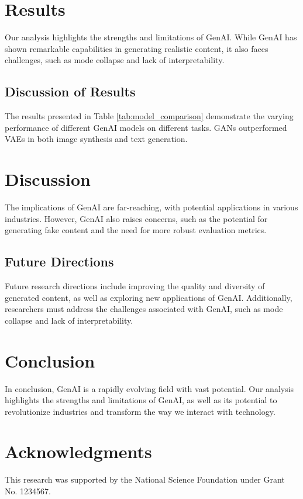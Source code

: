 \documentclass[12pt,a4paper]{article}
\begin{document}
\section{Results}
Our analysis highlights the strengths and limitations of GenAI. While GenAI has shown remarkable capabilities in generating realistic content, it also faces challenges, such as mode collapse and lack of interpretability.

\subsection{Discussion of Results}
The results presented in Table \ref{tab:model_comparison} demonstrate the varying performance of different GenAI models on different tasks. GANs outperformed VAEs in both image synthesis and text generation.

\section{Discussion}
The implications of GenAI are far-reaching, with potential applications in various industries. However, GenAI also raises concerns, such as the potential for generating fake content and the need for more robust evaluation metrics.

\subsection{Future Directions}
Future research directions include improving the quality and diversity of generated content, as well as exploring new applications of GenAI. Additionally, researchers must address the challenges associated with GenAI, such as mode collapse and lack of interpretability.

\section{Conclusion}
In conclusion, GenAI is a rapidly evolving field with vast potential. Our analysis highlights the strengths and limitations of GenAI, as well as its potential to revolutionize industries and transform the way we interact with technology.

\section*{Acknowledgments}
This research was supported by the National Science Foundation under Grant No. 1234567.
\end{document}
